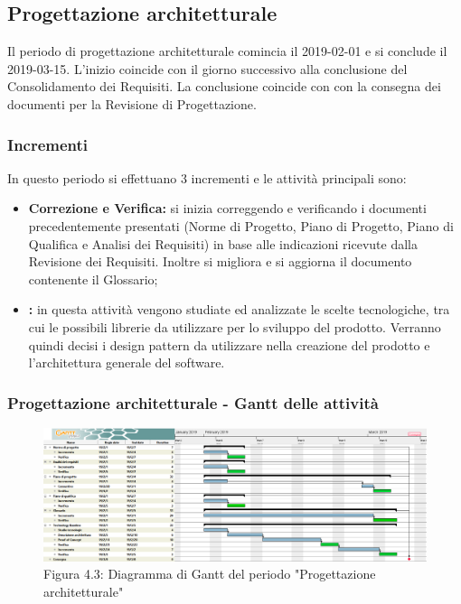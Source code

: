 \subsection{Progettazione architetturale}
Il periodo di progettazione architetturale comincia il 2019-02-01 e si conclude il 2019-03-15. L'inizio coincide con il giorno successivo alla conclusione del Consolidamento dei Requisiti. La conclusione coincide con con la consegna dei documenti per la Revisione di Progettazione. \\
\subsubsection{Incrementi}
In questo periodo si effettuano 3 incrementi e le attività principali sono:
\begin{itemize}
	\item \textbf{Correzione e Verifica:} si inizia correggendo e verificando i documenti precedentemente presentati (Norme di Progetto, Piano di Progetto, Piano di Qualifica e Analisi dei Requisiti) in base alle indicazioni ricevute dalla Revisione dei Requisiti. Inoltre si migliora e si aggiorna il documento contenente il Glossario;
	\item \textbf{:} in questa attività vengono studiate ed analizzate le scelte tecnologiche, tra cui le possibili librerie da utilizzare per lo sviluppo del prodotto. Verranno quindi decisi i design pattern da utilizzare nella creazione del prodotto e l'architettura generale del software.
\end{itemize}

\subsubsection{Progettazione architetturale - Gantt delle attività}

\begin{figure} [H]
	\centering
	\includegraphics[scale=0.3]{Res/Gantt/Progettazione}
	\caption{Figura 4.3: Diagramma di Gantt del periodo "Progettazione architetturale"}\label{}
\end{figure}

\pagebreak

